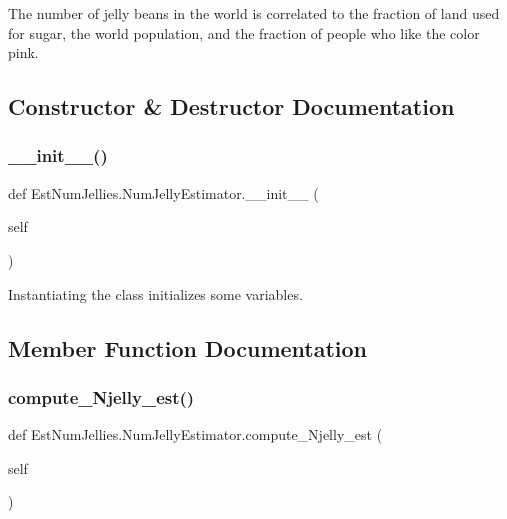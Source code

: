 The number of jelly beans in the world is correlated to the fraction of land used for sugar, the world population, and the fraction of people who like the color pink. 

\subsection{Constructor \& Destructor Documentation}
\mbox{\label{class_est_num_jellies_1_1_num_jelly_estimator_ab5d187b2dfbd0a52034edc88a6cd9171}} 
\subsubsection{\texorpdfstring{\+\_\+\+\_\+init\+\_\+\+\_\+()}{\_\_init\_\_()}}
{\footnotesize\ttfamily def Est\+Num\+Jellies.\+Num\+Jelly\+Estimator.\+\_\+\+\_\+init\+\_\+\+\_\+ (\begin{DoxyParamCaption}\item[{}]{self }\end{DoxyParamCaption})}



Instantiating the class initializes some variables. 



\subsection{Member Function Documentation}
\mbox{\label{class_est_num_jellies_1_1_num_jelly_estimator_ab4f98f6a7600e03ebea6fe738588c483}} 
\subsubsection{\texorpdfstring{compute\+\_\+\+Njelly\+\_\+est()}{compute\_Njelly\_est()}}
{\footnotesize\ttfamily def Est\+Num\+Jellies.\+Num\+Jelly\+Estimator.\+compute\+\_\+\+Njelly\+\_\+est (\begin{DoxyParamCaption}\item[{}]{self }\end{DoxyParamCaption})}



